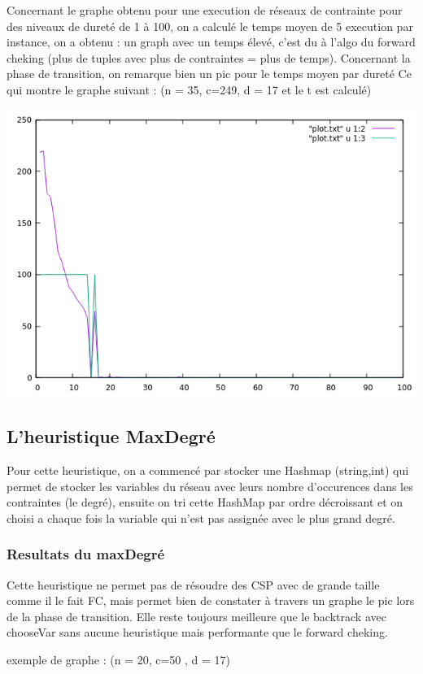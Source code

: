 \documentclass[oneside,13pt,a4paper]{article}
\begin{document}
Concernant le graphe obtenu pour une execution de réseaux de contrainte pour des niveaux de dureté de 1 à 100, on a calculé le temps moyen de 5 execution par instance, on a obtenu : un graph avec un temps élevé, c'est du à l'algo du forward cheking (plus de tuples avec plus de contraintes = plus de temps). Concernant la phase de transition, on remarque bien un pic pour le temps moyen par dureté
Ce qui montre le graphe  suivant : (n = 35, c=249, d = 17 et le t est calculé)

\includegraphics{img/FC.png}


\subsection{L'heuristique MaxDegré}

Pour cette heuristique, on a commencé par stocker une Hashmap (string,int) qui permet de stocker les variables du réseau avec leurs nombre d'occurences dans les contraintes (le degré), ensuite on tri cette HashMap par ordre décroissant et on choisi a chaque fois la variable qui n'est pas assignée avec le plus grand degré.
\subsubsection{Resultats du maxDegré}
Cette heuristique ne permet pas de résoudre des CSP avec de grande taille comme il le fait FC, mais permet bien de constater à travers un graphe le pic lors de la phase de transition.
Elle reste toujours meilleure que le backtrack avec chooseVar sans aucune heuristique mais performante que le forward cheking.

exemple de graphe : (n = 20, c=50 , d = 17)
\end{document}
